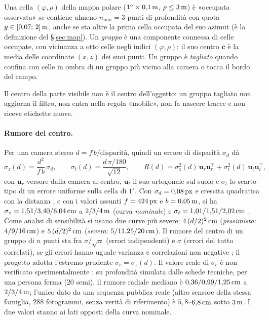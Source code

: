 \begin{definizione}\label{def:sti-gruppo}
Una cella $(\varphi,\rho)$ della mappa polare ($1^\circ\times0{,}1\,\mathrm{m}$, $\rho\le3\,\mathrm{m}$) è «occupata osservata» se contiene almeno $n_{\min}=3$ punti di profondità con quota $y\in[0{,}07;\,2]\,\mathrm{m}$, anche se sta oltre la prima cella occupata del suo azimut (è la definizione del \S\ref{sec:map}). Un \emph{gruppo} è una componente connessa di celle occupate, con vicinanza a otto celle negli indici $(\varphi,\rho)$; il suo centro $\mathbf c$ è la media delle coordinate $(x,z)$ dei suoi punti. Un gruppo è \emph{tagliato} quando confina con celle in ombra di un gruppo più vicino alla camera o tocca il bordo del campo.
\end{definizione}
Il centro della parte visibile non è il centro dell'oggetto: un gruppo tagliato non aggiorna il filtro, non entra nella regola «mobile», non fa nascere tracce e non riceve etichette nuove.

\paragraph{Rumore del centro.} Per una camera stereo $d=f\,b/\text{disparità}$, quindi un errore di disparità $\sigma_d$ dà
\begin{equation}\label{eq:sti-sigmaz}
\sigma_z(d)=\frac{d^2}{f\,b}\,\sigma_d,\qquad
\sigma_t(d)=\frac{d\,\pi/180}{\sqrt{12}},\qquad
R(d)=\sigma_z^2(d)\,\mathbf u_r\mathbf u_r^{\top}+\sigma_t^2(d)\,\mathbf u_t\mathbf u_t^{\top},
\end{equation}
con $\mathbf u_r$ versore dalla camera al centro, $\mathbf u_t$ il suo ortogonale sul suolo e $\sigma_t$ lo scarto tipo di un errore uniforme sulla cella di $1^\circ$. Con $\sigma_d=0{,}08\,\mathrm{px}$ e crescita quadratica con la distanza \cite{realsense-taratura-profondita}, e con i valori assunti $f=424\,\mathrm{px}$ e $b=0{,}05\,\mathrm{m}$, si ha $\sigma_z=1{,}51/3{,}40/6{,}04\,\mathrm{cm}$ a $2/3/4\,\mathrm{m}$ (curva \emph{nominale}) e $\sigma_t=1{,}01/1{,}51/2{,}02\,\mathrm{cm}$ . Come analisi di sensibilità si usano due curve più severe: $4\,(d/2)^2\,\mathrm{cm}$ (\emph{pessimista}: $4/9/16\,\mathrm{cm}$) e $5\,(d/2)^2\,\mathrm{cm}$ (\emph{severa}: $5/11{,}25/20\,\mathrm{cm}$). Il rumore del centro di un gruppo di $n$ punti sta fra $\sigma/\sqrt n$ (errori indipendenti) e $\sigma$ (errori del tutto correlati), se gli errori hanno uguale varianza e correlazioni non negative ; il progetto adotta l'estremo prudente $\sigma_c=\sigma_z(d)$. Il valore reale di $\sigma_c$ è non verificato sperimentalmente : su profondità simulata dalle schede tecniche, per una persona ferma (20 semi), il rumore radiale mediano è $0{,}36/0{,}99/1{,}25\,\mathrm{cm}$ a $2/3/4\,\mathrm{m}$; l'unico dato da una sequenza pubblica reale \cite{depthtrack} (altro sensore della stessa famiglia, 288 fotogrammi, senza verità di riferimento) è $5{,}8$--$6{,}8\,\mathrm{cm}$ sotto $3\,\mathrm{m}$. I due valori stanno ai lati opposti della curva nominale.

